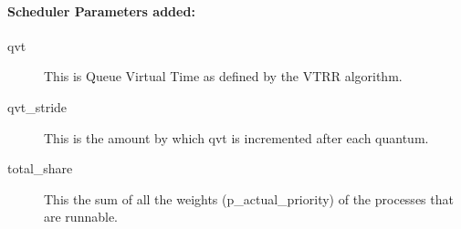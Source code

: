 \paragraph{Scheduler Parameters added:}
\begin{description}

\item[qvt] This is Queue Virtual Time as defined by the VTRR algorithm.
\item[qvt\_stride] This is the amount by which qvt is incremented after each quantum.
\item[total\_share] This the sum of all the weights (p\_actual\_priority) of the processes that are runnable.

\end{description}

